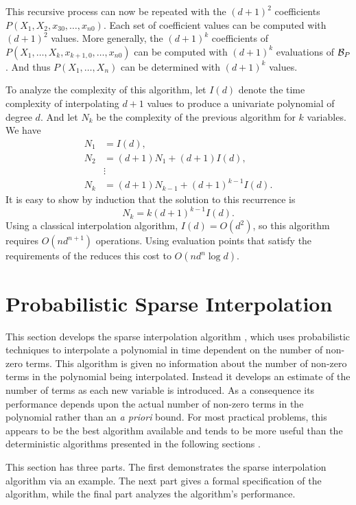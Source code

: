 This recursive process can now be repeated with the $(d+1)^2$
coefficients $P(X_1, X_2, x_{30}, \ldots, x_{n0})$.  Each set of
coefficient values can be computed with $(d+1)^2$ values.  More
generally, the $(d+1)^k$ coefficients of $P(X_1, \ldots, X_k,
x_{k+1,0}, \ldots, x_{n0})$ can be computed with $(d+1)^k$ evaluations
of ${\cal B}_P$.  And thus $P(X_1, \ldots, X_n)$ can be determined
with $(d+1)^k$ values.

To analyze the complexity of this algorithm, let $I(d)$ denote the
time complexity of interpolating $d+1$ values to produce a univariate
polynomial of degree $d$.  And let $N_k$ be the complexity of the
previous algorithm for $k$ variables.  We have
\[
\begin{aligned}
N_1 & = I(d), \\
N_2 & = (d + 1) N_1 + (d+1)I(d), \\
& \vdots \\
N_k & = (d+1) N_{k-1} + (d+1)^{k-1} I(d).
\end{aligned}
\]
It is easy to show by induction that the solution to this recurrence
is
\[
N_k = k(d+1)^{k-1} I(d).
\]
Using a classical interpolation algorithm, $I(d) = O(d^2)$, so this
algorithm requires $O(n d^{n+1})$ operations.  Using evaluation points
that satisfy the requirements of the 
reduces this cost to $O(n d^n \log d)$.

\section{Probabilistic Sparse Interpolation}
\label{Interp:PSparse:Sec}

This section develops the sparse interpolation algorithm
\cite{Zippel90}, which uses probabilistic techniques to interpolate a 
polynomial in time dependent on the number of non-zero terms.  This 
algorithm is given no information about the number of non-zero terms in 
the polynomial being interpolated. Instead it develops an estimate of the 
number of terms as each new variable is introduced.  As a consequence its 
performance depends upon the actual number of non-zero terms in the 
polynomial rather than an {\em a priori} bound.  For most practical 
problems, this appears to be the best algorithm available and tends to be 
more useful than the deterministic algorithms presented in the following 
sections \cite{Manocha91}.

This section has three parts.  The first demonstrates the sparse 
interpolation algorithm via an example. The next part gives a formal 
specification of the algorithm, while the final part analyzes the 
algorithm's performance. 

